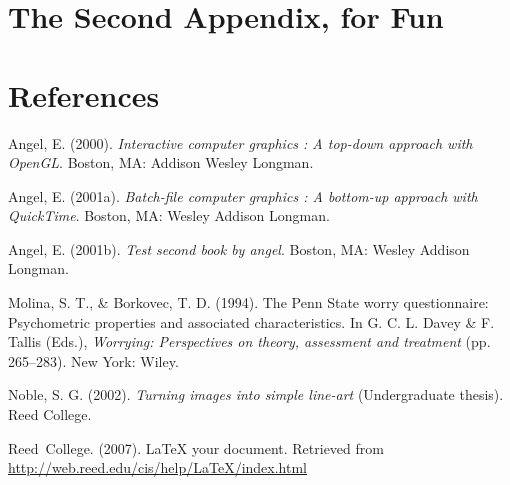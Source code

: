 \documentclass[12pt,twoside]{reedthesis}
\begin{document}
\chapter{The Second Appendix, for Fun}\label{the-second-appendix-for-fun}

\backmatter

\chapter*{References}\label{references}


\noindent

\setlength{\parindent}{-0.20in}
\setlength{\leftskip}{0.20in}
\setlength{\parskip}{8pt}

\label{refs}
\begin{CSLReferences}{1}{0}
Angel, E. (2000). \emph{Interactive computer graphics : A top-down approach with OpenGL}. Boston, MA: Addison Wesley Longman.

Angel, E. (2001a). \emph{Batch-file computer graphics : A bottom-up approach with QuickTime}. Boston, MA: Wesley Addison Longman.

Angel, E. (2001b). \emph{Test second book by angel}. Boston, MA: Wesley Addison Longman.

Molina, S. T., \& Borkovec, T. D. (1994). The {P}enn {S}tate worry questionnaire: Psychometric properties and associated characteristics. In G. C. L. Davey \& F. Tallis (Eds.), \emph{Worrying: Perspectives on theory, assessment and treatment} (pp. 265--283). New York: Wiley.

Noble, S. G. (2002). \emph{Turning images into simple line-art} (Undergraduate thesis). Reed College.

Reed~College. (2007). LaTeX your document. Retrieved from \url{http://web.reed.edu/cis/help/LaTeX/index.html}

\end{CSLReferences}

\end{document}
